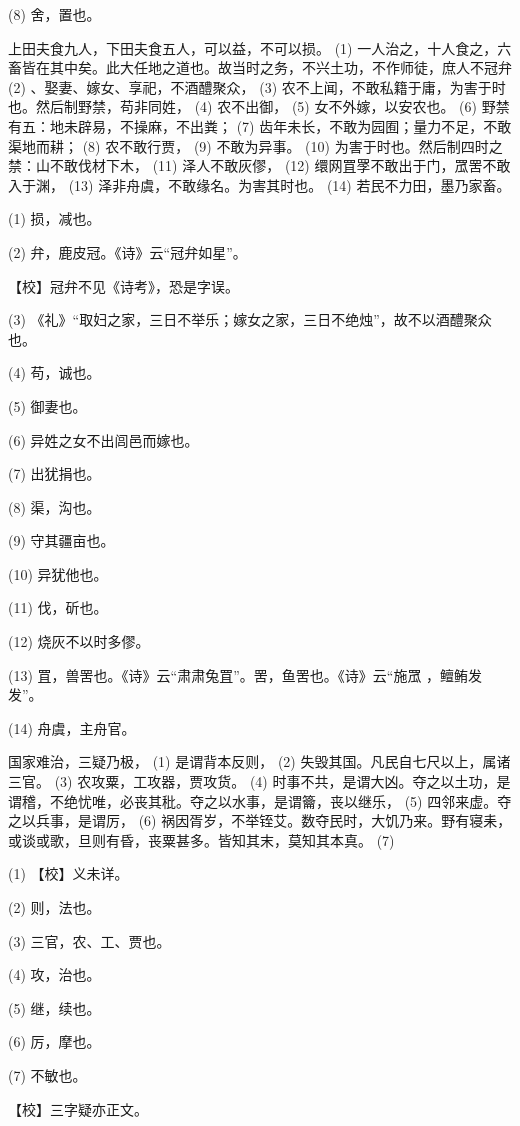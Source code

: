 \documentclass[12pt,UTF8]{ctexbook}
\begin{document}
(8) 舍，置也。

上田夫食九人，下田夫食五人，可以益，不可以损。 (1) 一人治之，十人食之，六畜皆在其中矣。此大任地之道也。故当时之务，不兴土功，不作师徒，庶人不冠弁 (2) 、娶妻、嫁女、享祀，不酒醴聚众， (3) 农不上闻，不敢私籍于庸，为害于时也。然后制野禁，苟非同姓， (4) 农不出御， (5) 女不外嫁，以安农也。 (6) 野禁有五：地未辟易，不操麻，不出粪； (7) 齿年未长，不敢为园囿；量力不足，不敢渠地而耕； (8) 农不敢行贾， (9) 不敢为异事。 (10) 为害于时也。然后制四时之禁：山不敢伐材下木， (11) 泽人不敢灰僇， (12) 缳网罝罦不敢出于门，罛罟不敢入于渊， (13) 泽非舟虞，不敢缘名。为害其时也。 (14) 若民不力田，墨乃家畜。

(1) 损，减也。

(2) 弁，鹿皮冠。《诗》云“冠弁如星”。

【校】冠弁不见《诗考》，恐是字误。

(3) 《礼》“取妇之家，三日不举乐；嫁女之家，三日不绝烛”，故不以酒醴聚众也。

(4) 苟，诚也。

(5) 御妻也。

(6) 异姓之女不出闾邑而嫁也。

(7) 出犹捐也。

(8) 渠，沟也。

(9) 守其疆亩也。

(10) 异犹他也。

(11) 伐，斫也。

(12) 烧灰不以时多僇。

(13) 罝，兽罟也。《诗》云“肃肃兔罝”。罟，鱼罟也。《诗》云“施罛 ，鳣鲔发发”。

(14) 舟虞，主舟官。

国家难治，三疑乃极， (1) 是谓背本反则， (2) 失毁其国。凡民自七尺以上，属诸三官。 (3) 农攻粟，工攻器，贾攻货。 (4) 时事不共，是谓大凶。夺之以土功，是谓稽，不绝忧唯，必丧其秕。夺之以水事，是谓籥，丧以继乐， (5) 四邻来虚。夺之以兵事，是谓厉， (6) 祸因胥岁，不举铚艾。数夺民时，大饥乃来。野有寝耒，或谈或歌，旦则有昏，丧粟甚多。皆知其末，莫知其本真。 (7)

(1) 【校】义未详。

(2) 则，法也。

(3) 三官，农、工、贾也。

(4) 攻，治也。

(5) 继，续也。

(6) 厉，摩也。

(7) 不敏也。

【校】三字疑亦正文。
\end{document}
